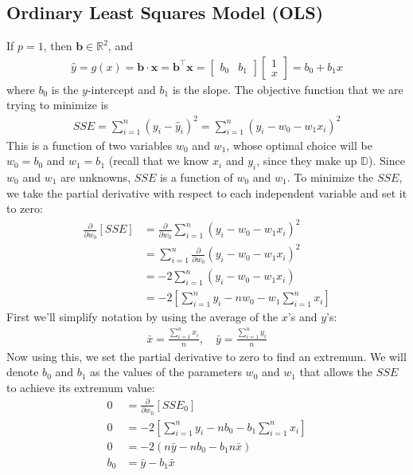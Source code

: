 \documentclass[12pt, a4paper]{article}
\theoremstyle{definition}
\begin{document}
	\subsection*{Ordinary Least Squares Model (OLS)}
	If $p=1$, then $\mathbf{b}\in\mathbb{R}^2$, and
	\begin{align*}
		\hat{y}=g(x) = \mathbf{b}\cdot \mathbf{x}
		=\mathbf{b}^\top \mathbf{x}
		=\begin{bmatrix}
			b_0 & b_1
		\end{bmatrix}
		\begin{bmatrix}
			1 \\
			x
		\end{bmatrix}
		=b_0 + b_1x
	\end{align*}
	where $b_0$ is the $y$-intercept and $b_1$ is the slope. The objective function that we
	are trying to minimize is
	\begin{align*}
		SSE = \sum_{i=1}^{n}(y_i - \hat{y}_i)^2=\sum_{i=1}^{n}(y_i-w_0-w_1x_i)^2
	\end{align*}
	This is a function of two variables $w_0$ and $w_1$, whose optimal choice
	will be $w_0=b_0$ and $w_1=b_1$ (recall that we know $x_i$ and $y_i$,
	since they make up $\mathbb{D}$). Since $w_0$ and $w_1$ are unknowns, $SSE$
	is a function of $w_0$ and $w_1$. To minimize the $SSE$, we take the partial derivative with
	respect to each independent variable and set it to zero:
	\begin{align*}
		\frac{\partial}{\partial w_0}[SSE]&=\frac{\partial}{\partial w_0}
		\sum_{i=1}^{n}(y_i-w_0-w_1x_i)^2\\
		&=\sum_{i=1}^{n}\frac{\partial}{\partial w_0}(y_i-w_0-w_1x_i)^2
		\tag{by the linearity of the derivative}\\
		&=-2\sum_{i=1}^{n}(y_i-w_0-w_1x_i)
		\tag{by the Chain Rule}\\
		&=-2\left[\sum_{i=1}^{n}y_i - nw_0 - w_1\sum_{i=1}^{n}x_i\right]
	\end{align*}
	First we'll simplify notation by using the average of the $x$'s and $y$'s:
	\begin{align*}
		\bar{x}=\frac{\sum_{i=1}^{n}x_i}{n},\quad \bar{y}=\frac{\sum_{i=1}^{n}y_i}{n}
	\end{align*}
	Now  using this, we set the partial derivative to zero to find an extremum.
	We will denote $b_0$ and $b_1$ as the values of the parameters $w_0$ and $w_1$
	that allows the $SSE$ to achieve its extremum value:
	\begin{align}
		0 &= \frac{\partial}{\partial w_0}[SSE_0]\nonumber\\
		0&=-2\left[\sum_{i=1}^{n}y_i - nb_0 - b_1\sum_{i=1}^{n}x_i\right]\nonumber\\
		0&=-2(n\bar{y} - n b_0 - b_1n\bar{x})\nonumber\\
		b_0&=\bar{y}-b_1\bar{x}\label{eqn:b_0-parameter}
	\end{align}
\end{document}
